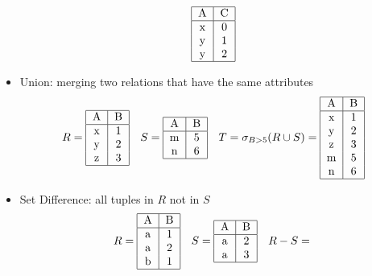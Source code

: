 \documentclass{math}
\begin{document}
\begin{itemize}
    \[ \begin{tabular}{|c|c|c|c|}
      \hline
      A & C \\
      \hline
      x & 0 \\
      y & 1 \\
      y & 2 \\
      \hline
    \end{tabular} \]
  \item Union: merging two relations that have the same attributes
    \[ R = \begin{tabular}{|c|c|}
      \hline
      A & B \\
      \hline
      x & 1 \\
      y & 2 \\
      z & 3 \\
      \hline
    \end{tabular} \quad
    S = \begin{tabular}{|c|c|}
      \hline
      A & B \\
      \hline
      m & 5 \\
      n & 6 \\
      \hline
    \end{tabular} \quad
    T = \sigma_{B>5}(R\cup S) = \begin{tabular}{|c|c|}
      \hline
      A & B \\
      \hline
      x & 1 \\
      y & 2 \\
      z & 3 \\
      m & 5 \\
      n & 6 \\
      \hline
    \end{tabular} \]
  \item Set Difference: all tuples in \( R \) not in \( S \)
    \[ R = \begin{tabular}{|c|c|}
      \hline
      A & B \\
      \hline
      a & 1 \\
      a & 2 \\
      b & 1 \\
      \hline
    \end{tabular} \quad
    S = \begin{tabular}{|c|c|}
      \hline
      A & B \\
      \hline
      a & 2 \\
      a & 3 \\
      \hline
    \end{tabular} \quad
    R-S = \begin{tabular}{|c|c|}

\end{tabular}\]
\end{itemize}
\end{document}
